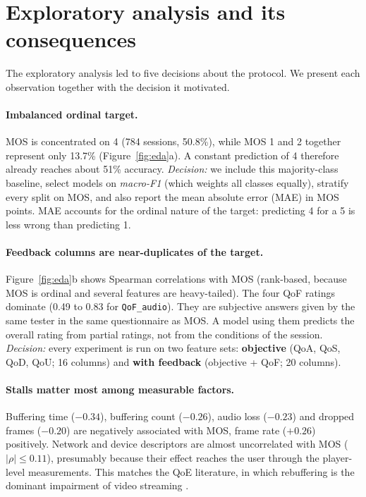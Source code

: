 \documentclass[11pt,a4paper]{article}
\newcommand{\code}[1]{\texttt{#1}}
\begin{document}
\section{Exploratory analysis and its consequences}
\label{sec:eda}
The exploratory analysis led to five decisions about the protocol. We present each observation together
with the decision it motivated.

\paragraph{Imbalanced ordinal target.}
MOS is concentrated on 4 (784 sessions, 50.8\%), while MOS 1 and 2 together represent only 13.7\%
(Figure~\ref{fig:eda}a). A constant prediction of 4 therefore already reaches about 51\% accuracy.
\emph{Decision:} we include this majority-class baseline, select models on \emph{macro-F1} (which weights
all classes equally), stratify every split on MOS, and also report the mean absolute error (MAE) in MOS
points. MAE accounts for the ordinal nature of the target: predicting 4 for a 5 is less wrong than
predicting 1.

\paragraph{Feedback columns are near-duplicates of the target.}
Figure~\ref{fig:eda}b shows Spearman correlations with MOS (rank-based, because MOS is ordinal and several
features are heavy-tailed). The four QoF ratings dominate (0.49 to 0.83 for \code{QoF\_audio}). They are
subjective answers given by the same tester in the same questionnaire as MOS. A model using them predicts
the overall rating from partial ratings, not from the conditions of the session.
\emph{Decision:} every experiment is run on two feature sets: \textbf{objective} (QoA, QoS, QoD, QoU; 16
columns) and \textbf{with feedback} (objective + QoF; 20 columns).

\paragraph{Stalls matter most among measurable factors.}
Buffering time ($-0.34$), buffering count ($-0.26$), audio loss ($-0.23$) and dropped frames ($-0.20$) are
negatively associated with MOS, frame rate ($+0.26$) positively. Network and device descriptors are almost
uncorrelated with MOS ($|\rho| \le 0.11$), presumably because their effect reaches the user through the
player-level measurements. This matches the QoE literature, in which rebuffering is the dominant impairment
of video streaming \citep{hossfeld2012initial,seufert2015survey}.
\end{document}
